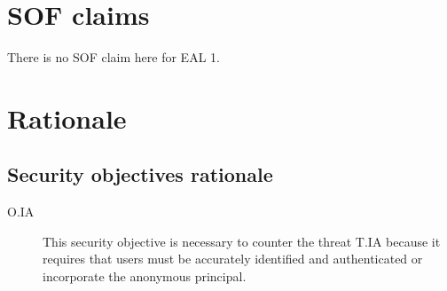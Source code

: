 \documentclass[10pt,a4paper,english]{book}
\begin{document}

\hypertarget{sof-claims}{}
\chapter{SOF claims}

There is no SOF claim here for EAL 1.



\hypertarget{rationale}{}
\chapter{Rationale}



\hypertarget{security-objectives-rationale}{}
\section{Security objectives rationale}
\begin{description}
\item[O.IA]

This security objective is necessary to counter the threat T.IA
because it requires that users must be accurately identified and
authenticated or incorporate the anonymous principal.

\end{description}
\end{document}
